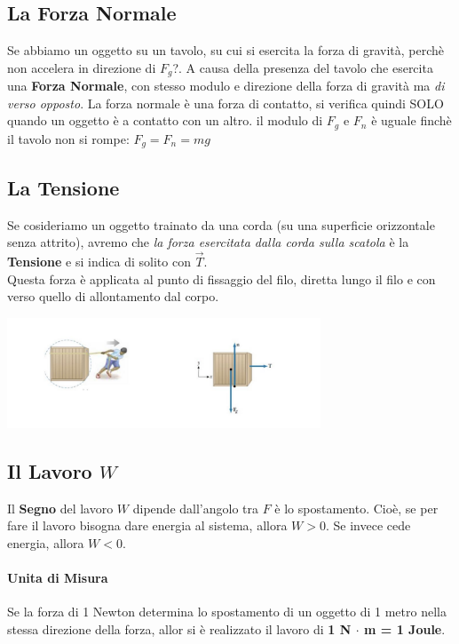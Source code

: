 \documentclass[12pt, a4paper, openany]{book}
\begin{document}
\subsection{La Forza Normale}
Se abbiamo un oggetto su un tavolo, su cui si esercita la forza di gravità, perchè non accelera in direzione di $F_g$?.
A causa della presenza del tavolo che esercita una \textbf{Forza Normale}, con stesso modulo e direzione della forza di gravità ma \emph{di verso opposto}.
La forza normale è una forza di contatto, si verifica quindi SOLO quando un oggetto è a contatto con un altro.
il modulo di $F_g$ e $F_n$ è uguale finchè il tavolo non si rompe: $F_g = F_n = mg$
\subsection{La Tensione}
Se cosideriamo un oggetto trainato da una corda (su una superficie orizzontale senza attrito), avremo che \emph{la forza esercitata dalla corda sulla scatola} è la \textbf{Tensione}
e si indica di solito con $\overrightarrow{T}$.\\
Questa forza è applicata al punto di fissaggio del filo, diretta lungo il filo e con verso quello di allontamento dal corpo.
\begin{center}
    \includegraphics[width=0.7\textwidth]{Tensione.jpg}
\end{center}
\subsection{Il Lavoro $W$}
Il \textbf{Segno} del lavoro $W$ dipende dall'angolo tra $F$ è lo spostamento.
Cioè, se per fare il lavoro bisogna dare energia al sistema, allora $W>0$.
Se invece cede energia, allora $W<0$.
\paragraph{Unita di Misura}
Se la forza di 1 Newton determina lo spostamento di un oggetto di 1 metro nella stessa direzione della forza,
allor si è realizzato il lavoro di \textbf{1 N $\cdot$ m = 1 Joule}.
\end{document}

